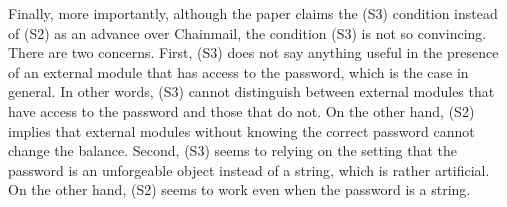 \documentclass[11pt]{amsart}
\begin{document}
Finally, more importantly, although the paper claims the (S3) condition instead of (S2) as an advance over Chainmail, the condition (S3) is not so convincing. There are two concerns. First, (S3) does not say anything useful in the presence of an external module that has access to the password, which is the case in general. In other words, (S3) cannot distinguish between external modules that have access to the password and those that do not. On the other hand, (S2) implies that external modules without knowing the correct password cannot change the balance. Second, (S3) seems to relying on the setting that the password is an unforgeable object instead of a string, which is rather artificial. On the other hand, (S2) seems to work even when the password is a string.



 
\end{document}
